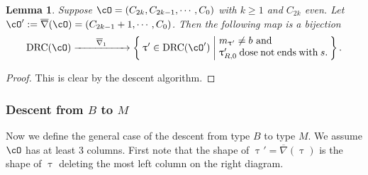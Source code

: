 \documentclass[12pt,a4paper]{amsart}
\def\eDD{\overline{\nabla}}
\def\eDDo{\overline{\nabla}_1}
\numberwithin{equation}{section}
\newtheorem{lem}[thm]{Lemma}
\theoremstyle{remark}
\def\drc{\mathrm{DRC}}
\def\cOp{\cO^{\prime}}
\def\uptaup{\uptau^{\prime}}
\begin{document}
\begin{lem}\label{lem:gd.BM}
  Suppose $\cO = (C_{2k},C_{2k-1}, \cdots, C_{0})$ with $k\geq 1$ and $C_{2k}$ even.
  Let $\cOp := \eDD(\cO)=(C_{2k-1}+1,\cdots, C_{0})$.
  Then the following map is a bijection
  \[
    \drc(\cO) \xrightarrow{\hspace{2em}\eDDo\hspace{2em}}
    \Set{\uptaup\in \drc(\cOp)| \begin{minipage}{11em}
        $m_{\uptaup}\neq b$ and\\
         $\uptaup_{R,0}$ dose not ends with $s$.
      \end{minipage}
    }. %
  \]
\end{lem}
\begin{proof}
  This is clear by the descent algorithm.
\end{proof}


\subsubsection{Descent from $B$ to $M$}
Now we define the general case of the descent from type $B$ to type $M$.
We assume $\cO$ has at least 3 columns.
First note that the shape of $\uptau' = \eDD(\uptau)$ is the shape of $\uptau$ deleting the
most left column on the right diagram.
\end{document}
